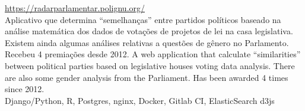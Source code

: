 \documentclass[]{friggeri-cv}
\begin{document}
\textbf{} \hfill \small{\href{https://radarparlamentar.polignu.org/}{https://radarparlamentar.polignu.org/}}\\
\small{%
{Aplicativo que determina ``semelhanças'' entre partidos \nohyphens{políticos} baseado na análise matemática dos dados de votações de projetos de lei na casa \nohyphens{legislativa}. Existem ainda algumas análises relativas a questões de gênero no Parlamento.\\
Recebeu 4 premiações desde 2012.}%
{A web application that calculate ``similarities'' between political parties based on legislative houses voting data analysis. There are also some gender analysis from the Parliament.
Has been awarded 4 times since 2012.}}\\
\maintechs{} Django/Python, R, Postgres, nginx, Docker, Gitlab CI, ElasticSearch \eand{} d3js
\end{document}
